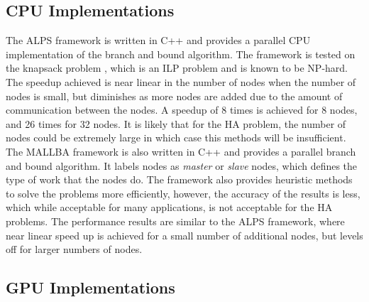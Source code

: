 \documentclass[10pt,twocolumn]{witseiepaper}
\begin{document}
\subsection{ CPU Implementations }

The ALPS framework \cite{xu:2005} is written in C++ and provides a parallel CPU implementation of the branch
and bound algorithm. The framework is tested on the knapsack problem \cite{kedia:2005}, which is an ILP problem 
and is known to be NP-hard. The speedup achieved is near linear in the number of nodes when the number of 
nodes is small, but diminishes as more nodes are added due to the amount of communication between the nodes. 
A speedup of 8 times is achieved for 8 nodes, and 26 times for 32 nodes. It is likely that for the HA problem, 
the number of nodes could be extremely large in which case this methods will be insufficient. \\
The MALLBA framework \cite{alba:2002} is also written in C++ and provides a parallel branch and bound
algorithm. It labels nodes as \textit{master} or \textit{slave} nodes, which defines the type of work that the
nodes do. The framework also provides heuristic methods to solve the problems more efficiently, however, the
accuracy of the results is less, which while acceptable for many applications, is not acceptable for the HA
problems. The performance results are similar to the ALPS framework, where near linear speed up is achieved for
a small number of additional nodes, but levels off for larger numbers of nodes.\\

\subsection{ GPU Implementations }
\end{document}
